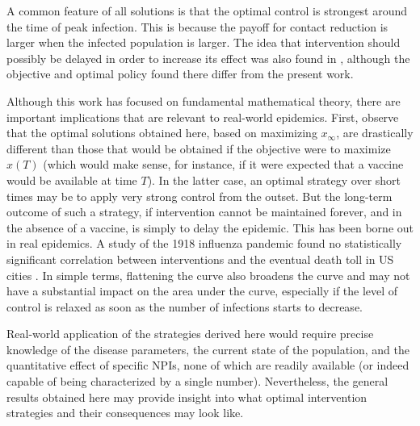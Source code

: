\documentclass[english,12pt,letter]{article}
\newcommand{\Sinf}{x_\infty}
\begin{document}
A common feature of all solutions is that the optimal control is strongest around
the time of peak infection.  This is because the payoff for contact reduction
is larger when the infected population is larger.
The idea that intervention should possibly be delayed in order to increase
its effect was also found in \cite{ballard2017intervention}, although 
the objective and optimal policy found there differ from the present work.

Although this work has focused on fundamental mathematical theory, there are
important implications that are relevant to real-world epidemics.  First,
observe that the optimal solutions obtained here, based on maximizing $\Sinf$, are
drastically different than those that would be obtained if the objective
were to maximize $x(T)$ (which would make sense, for instance, if it were
expected that a vaccine would be available at time $T$).  In the latter case, an optimal strategy over
short times may be to apply very strong control from the outset.  But the long-term
outcome of such a strategy, if intervention cannot be maintained forever,
and in the absence of a vaccine, is simply to delay the epidemic.  This has
been borne out in real epidemics.
A study of the 1918 influenza pandemic found no statistically significant
correlation between interventions and the eventual death toll in US cities
\cite{hatchett2007public}.  In simple terms, flattening the curve also
broadens the curve and may not have a substantial impact on the area under the
curve, especially if the level of control is relaxed as soon as the
number of infections starts to decrease.

Real-world application of the strategies derived here would require
precise knowledge of the disease parameters, the current state of the
population, and the quantitative effect of specific NPIs, none of which
are readily available (or indeed capable of being characterized by a single
number).  Nevertheless, the general results obtained here may provide insight
into what optimal intervention strategies and their consequences may look like.




\end{document}
